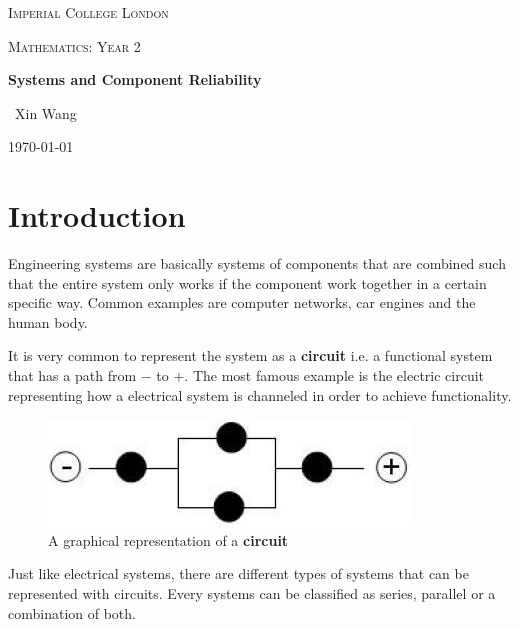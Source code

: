 \documentclass[10pt,a4paper]{article}
\begin{document}
\begin{titlepage}
	\centering
	{\scshape\LARGE Imperial College London \par}
	\vspace{1cm}
	{\scshape\Large Mathematics: Year 2\par}
	\vspace{1.5cm}
	{\huge\bfseries Systems and Component Reliability \par}
	\vspace{2cm}
	{\Large\ Xin Wang }
	\vfill
	{\large \today\par}
\end{titlepage}

\begin{abstract}
Engineering systems will inevitably fail and is deeply studied in systems engineering.  

Reliability engineering is a sub-discipline of systems engineering that studies the ability
of equipment to function without failure. 

\end{abstract}

\tableofcontents
\pagebreak

\section{Introduction}

Engineering systems are basically systems of components that are combined such that the entire system
only works if the component work together in a certain specific way. Common examples are
computer networks, car engines and the human body.

It is very common to represent the system as a \textbf{circuit} i.e. a functional system that has a path
from $-$ to $+$. The most famous example is the electric circuit representing how a electrical
system is channeled in order to achieve functionality. \par
\begin{figure} [h!]
    \centering
    \includegraphics[scale=0.6]{circuit.JPG}
    \caption{A graphical representation of a \textbf{circuit}}
\end{figure}
Just like electrical systems, there are different types of systems that can be represented with
circuits. Every systems can be classified as series, parallel or a combination of both.
\end{document}
